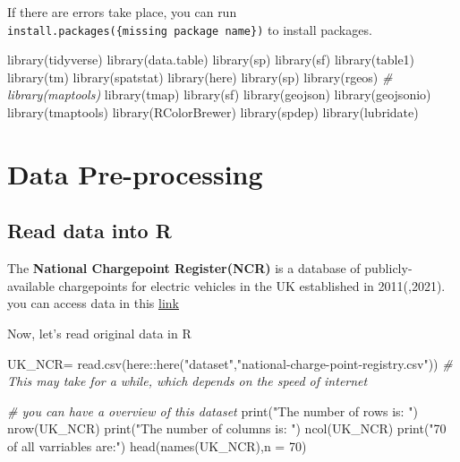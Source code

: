 \documentclass[
]{book}
\newenvironment{Shaded}{\begin{snugshade}}{\end{snugshade}}
\newcommand{\AttributeTok}[1]{\textcolor[rgb]{0.77,0.63,0.00}{#1}}
\newcommand{\CommentTok}[1]{\textcolor[rgb]{0.56,0.35,0.01}{\textit{#1}}}
\newcommand{\DecValTok}[1]{\textcolor[rgb]{0.00,0.00,0.81}{#1}}
\newcommand{\FunctionTok}[1]{\textcolor[rgb]{0.00,0.00,0.00}{#1}}
\newcommand{\NormalTok}[1]{#1}
\newcommand{\OtherTok}[1]{\textcolor[rgb]{0.56,0.35,0.01}{#1}}
\newcommand{\SpecialCharTok}[1]{\textcolor[rgb]{0.00,0.00,0.00}{#1}}
\newcommand{\StringTok}[1]{\textcolor[rgb]{0.31,0.60,0.02}{#1}}
\begin{document}
If there are errors take place, you can run \texttt{install.packages(\{missing\ package\ name\})} to install packages.

\begin{Shaded}
\begin{Highlighting}[]
\FunctionTok{library}\NormalTok{(tidyverse)}
\FunctionTok{library}\NormalTok{(data.table)}
\FunctionTok{library}\NormalTok{(sp)}
\FunctionTok{library}\NormalTok{(sf)}
\FunctionTok{library}\NormalTok{(table1)}
\FunctionTok{library}\NormalTok{(tm)}
\FunctionTok{library}\NormalTok{(spatstat)}
\FunctionTok{library}\NormalTok{(here)}
\FunctionTok{library}\NormalTok{(sp)}
\FunctionTok{library}\NormalTok{(rgeos)}
\CommentTok{\# library(maptools)}
\FunctionTok{library}\NormalTok{(tmap)}
\FunctionTok{library}\NormalTok{(sf)}
\FunctionTok{library}\NormalTok{(geojson)}
\FunctionTok{library}\NormalTok{(geojsonio)}
\FunctionTok{library}\NormalTok{(tmaptools)}
\FunctionTok{library}\NormalTok{(RColorBrewer)}
\FunctionTok{library}\NormalTok{(spdep) }
\FunctionTok{library}\NormalTok{(lubridate)}
\end{Highlighting}
\end{Shaded}

\hypertarget{data-pre-processing}{%
\chapter{Data Pre-processing}\label{data-pre-processing}}

\hypertarget{read-data-into-r}{%
\section{Read data into R}\label{read-data-into-r}}

The \textbf{National Chargepoint Register(NCR)} is a database of publicly-available chargepoints for electric vehicles in the UK established in 2011(,2021). you can access data in this \href{https://www.gov.uk/guidance/find-and-use-data-on-public-electric-vehicle-chargepoints\#accessing-data-on-ncv}{link}

Now, let's read original data in R

\begin{Shaded}
\begin{Highlighting}[]
\NormalTok{UK\_NCR}\OtherTok{=} \FunctionTok{read.csv}\NormalTok{(here}\SpecialCharTok{::}\FunctionTok{here}\NormalTok{(}\StringTok{"dataset"}\NormalTok{,}\StringTok{"national{-}charge{-}point{-}registry.csv"}\NormalTok{)) }
\CommentTok{\# This may take for a while, which depends on the speed of internet}

\CommentTok{\# you can have a overview of this dataset}
\FunctionTok{print}\NormalTok{(}\StringTok{"The number of rows is: "}\NormalTok{)}
\FunctionTok{nrow}\NormalTok{(UK\_NCR)}
\FunctionTok{print}\NormalTok{(}\StringTok{"The number of columns is: "}\NormalTok{)}
\FunctionTok{ncol}\NormalTok{(UK\_NCR)}
\FunctionTok{print}\NormalTok{(}\StringTok{"70 of all varriables are:"}\NormalTok{)}
\FunctionTok{head}\NormalTok{(}\FunctionTok{names}\NormalTok{(UK\_NCR),}\AttributeTok{n =} \DecValTok{70}\NormalTok{)}
\end{Highlighting}
\end{Shaded}
\end{document}
